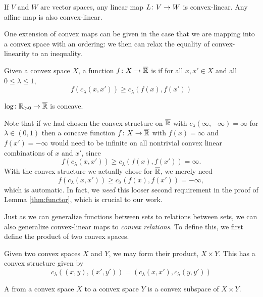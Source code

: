 \documentclass[12pt, reqno]{amsart}
\newcommand{\pos}{\real_{> 0}}
\newcommand{\extreal}{\overline{\real}}
\begin{document}
\begin{example}
    If $V$ and $W$ are vector spaces, any linear map $L \colon V \rightarrow W$ is convex-linear. Any affine map is also convex-linear.
\end{example}

One extension of convex maps can be given in the case that we are mapping into a convex space with an ordering: we then can relax the equality of convex-linearity to an inequality.

\begin{definition} 
    Given a convex space $X$, a function $f \maps X \to \extreal$ is  if for all $x, x' \in X$ and all $0 \le \lambda \le 1$, 
    \[   f(c_\lambda(x, x')) \geq c_\lambda(f(x), f(x'))\]
\end{definition}

\begin{example}
    $\log \maps \pos \to \extreal$ is concave.
\end{example}

Note that if we had chosen the convex structure on $\extreal$ with $c_\lambda(\infty, -\infty) = \infty$ for $\lambda \in (0, 1)$ then a concave function $f \maps X \to \extreal$ with $f(x) = \infty$ and $f(x') = -\infty$ would need to be infinite on all nontrivial convex linear combinations of $x$ and $x'$, since
\[ f(c_\lambda(x, x')) \geq c_\lambda(f(x), f(x')) = \infty. \]
With the convex structure we actually chose for $\extreal$, we merely need
\[ f(c_\lambda(x, x')) \geq c_\lambda(f(x), f(x')) = -\infty, \]
which is automatic. In fact, we \emph{need} this looser second requirement in the proof of Lemma \ref{thm:functor}, which is crucial to our work.

Just as we can generalize functions between sets to relations between sets, we can also generalize convex-linear maps to \emph{convex relations}. To define this, we first define the product of two convex spaces.

\begin{definition} \label{def:product_convex_spaces}
    Given two convex spaces $X$ and $Y$, we may form their product, $X \times Y$. This has a convex structure given by
    \[ c_\lambda((x, y), (x', y')) = (c_\lambda(x, x'), c_\lambda(y, y'))\]
\end{definition}

\begin{definition}
    A  from a convex space $X$ to a convex space $Y$ is a convex subspace of $X \times Y$.
\end{definition}
\end{document}
